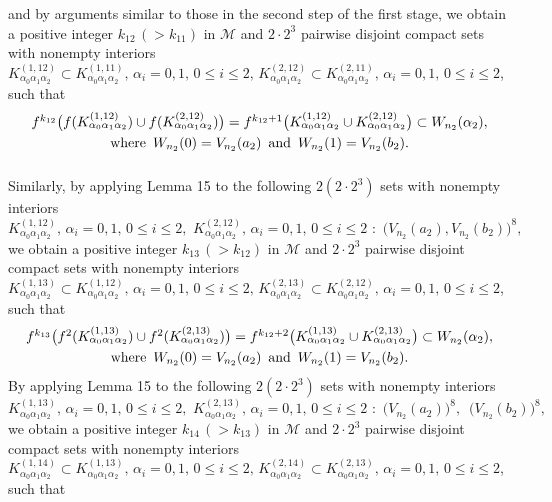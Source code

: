 \documentclass[12pt]{article}
\newcommand{\al}{\alpha}
\begin{document}
and by arguments similar to those in the second step of the first stage, we obtain a positive integer $k_{12} \, (> k_{11})$ in $\mathcal M$ and $2 \cdot 2^3$ pairwise disjoint compact sets with nonempty interiors $K_{\al_0\al_1\al_2}^{(1,12)} \subset K_{\al_0\al_1\al_2}^{(1,11)}, \, \al_i = 0, 1, \, 0 \le i \le 2, \, K_{\al_0\al_1\al_2}^{(2,12)} \subset K_{\al_0\al_1\al_2}^{(2,11)}, \, \al_i = 0, 1, \, 0 \le i \le 2$, such that 
\begin{multline*}
$$
f^{k_{12}}\big(f(K_{\al_0\al_1\al_2}^{(1,12)}) \cup f(K_{\al_0\al_1\al_2}^{(2,12)})\big) = f^{k_{12}+1}\big(K_{\al_0\al_1\al_2}^{(1,12)} \cup K_{\al_0\al_1\al_2}^{(2,12)}\big) \subset W_{n_2}(\al_2), \\ \text{where} \,\,\, W_{n_2}(0) = V_{n_2}(a_2) \,\,\, \text{and} \,\,\, W_{n_2}(1) = V_{n_2}(b_2).\vspace{.15in}
$$
\end{multline*}
\indent Similarly, by applying Lemma 15 to the following $2(2 \cdot 2^3)$ sets with nonempty interiors 
$$
K_{\al_0\al_1\al_2}^{(1,12)}, \, \al_i = 0, 1, \, 0 \le i \le 2, \,\, K_{\al_0\al_1\al_2}^{(2,12)}, \, \al_i = 0, 1, \, 0 \le i \le 2 \,\, : \,\, \big(V_{n_2}(a_2), V_{n_2}(b_2)\big)^8,
$$
we obtain a positive integer $k_{13} \, (> k_{12})$ in $\mathcal M$ and $2 \cdot 2^3$ pairwise disjoint compact sets with nonempty interiors $K_{\al_0\al_1\al_2}^{(1,13)} \subset K_{\al_0\al_1\al_2}^{(1,12)}, \, \al_i = 0, 1, \, 0 \le i \le 2, \, K_{\al_0\al_1\al_2}^{(2,13)} \subset K_{\al_0\al_1\al_2}^{(2,12)}, \, \al_i = 0, 1, \, 0 \le i \le 2$, such that 
\begin{multline*}
$$
f^{k_{13}}\big(f^2(K_{\al_0\al_1\al_2}^{(1,13)}) \cup f^2(K_{\al_0\al_1\al_2}^{(2,13)})\big) = f^{k_{12}+2}\big(K_{\al_0\al_1\al_2}^{(1,13)} \cup K_{\al_0\al_1\al_2}^{(2,13)}\big) \subset W_{n_2}(\al_2), \\ \text{where} \,\,\, W_{n_2}(0) = V_{n_2}(a_2) \,\,\, \text{and} \,\,\, W_{n_2}(1) = V_{n_2}(b_2).
$$
\end{multline*}
\indent By applying Lemma 15 to the following $2(2 \cdot 2^3)$ sets with nonempty interiors 
$$
K_{\al_0\al_1\al_2}^{(1,13)}, \, \al_i = 0, 1, \, 0 \le i \le 2, \,\, K_{\al_0\al_1\al_2}^{(2,13)}, \, \al_i = 0, 1, \, 0 \le i \le 2 \,\, : \,\, \big(V_{n_2}(a_2)\big)^8, \,\,\, \big(V_{n_2}(b_2)\big)^8,
$$
we obtain a positive integer $k_{14} \, (> k_{13})$ in $\mathcal M$ and $2 \cdot 2^3$ pairwise disjoint compact sets with nonempty interiors $K_{\al_0\al_1\al_2}^{(1,14)} \subset K_{\al_0\al_1\al_2}^{(1,13)}, \, \al_i = 0, 1, \, 0 \le i \le 2, \, K_{\al_0\al_1\al_2}^{(2,14)} \subset K_{\al_0\al_1\al_2}^{(2,13)}, \, \al_i = 0, 1, \, 0 \le i \le 2$, such that 
\end{document}
